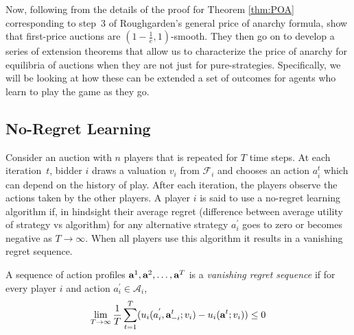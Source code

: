 \documentclass[12pt,twoside]{reedthesis}
\begin{document}
Now, following from the details of the proof for Theorem \ref{thm:POA} corresponding to step~3 of Roughgarden's general price of anarchy formula, \cite{Roughgarden2017} show that first-price auctions are $(1-\frac{1}{e}, 1)$-smooth. They then go on to develop a series of extension theorems that allow us to characterize the price of anarchy for equilibria of auctions when they are not just for pure-strategies. Specifically, we will be looking at how these can be extended a set of outcomes for agents who learn to play the game as they go.



\subsection{No-Regret Learning}
Consider an auction with $n$ players that is repeated for $T$ time steps. At each iteration~$t$, bidder $i$ draws a valuation $v_i$ from $\mathcal{F}_i$ and chooses an action $a_i^t$ which can depend on the history of play. After each iteration, the players observe the actions taken by the other players. 
A player $i$ is said to use a no-regret learning algorithm if, in hindsight their average regret (difference between average utility of strategy vs algorithm) for any alternative strategy $a_i^{'}$ goes to zero or becomes negative as $T \rightarrow \infty$. When all players use this algorithm it results in a vanishing regret sequence.

\begin{dfn}
	A sequence of action profiles $\textbf{a}^1 , \textbf{a}^2, \ldots, \textbf{a}^T$ is a \textit{vanishing regret sequence} if for every player $i$ and action $a_i^{'} \in \mathcal{A}_i$,
	$$ \lim\limits_{T \rightarrow \infty} \frac{1}{T} \sum_{t=1}^{T}(u_i(a_i^{'}, \textbf{a}_{-i}^{t};v_i) - u_i(\textbf{a}^t; v_i)) \leq 0$$
	\label{dfn:noregret} 
\end{dfn}
\end{document}
